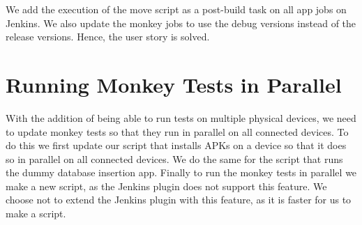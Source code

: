 We add the execution of the move script as a post-build task on all app jobs on Jenkins. We also update the monkey jobs to use the debug versions instead of the release versions. Hence, the user story is solved.


\section{Running Monkey Tests in Parallel}\label{sec:monkey_in_parallel}
With the addition of being able to run tests on multiple physical devices, we need to update monkey tests so that they run in parallel on all connected devices. To do this we first update our script that installs APKs on a device so that it does so in parallel on all connected devices. We do the same for the script that runs the dummy database insertion app. Finally to run the monkey tests in parallel we make a new script, as the Jenkins plugin does not support this feature. We choose not to extend the Jenkins plugin with this feature, as it is faster for us to make a script.

